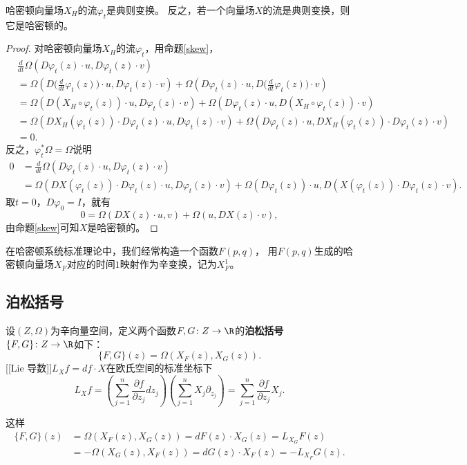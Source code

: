 \begin{proposition}
    哈密顿向量场$X_H$的流$\varphi_t$是典则变换。
    反之，若一个向量场$X$的流是典则变换，则它是哈密顿的。
\end{proposition}
\begin{proof}
    对哈密顿向量场$X_H$的流$\varphi_t$，用命题\ref{skew}，
    \begin{align*}
        &\frac{d}{dt}\Omega(D\varphi_t(z)\cdot u,D\varphi_t(z)\cdot v)\\
        &=\Omega(D\Big(\frac{d}{dt}\varphi_t(z)\Big)\cdot u,D\varphi_t(z)\cdot v)
        +\Omega(D\varphi_t(z)\cdot u,D\Big(\frac{d}{dt}\varphi_t(z)\Big)\cdot v)\\
        &=\Omega(D(X_H\circ\varphi_t(z))\cdot u,D\varphi_t(z)\cdot v)
        +\Omega(D\varphi_t(z)\cdot u,D(X_H\circ\varphi_t(z))\cdot v)\\
        &=\Omega(DX_H(\varphi_t(z))\cdot D\varphi_t(z)\cdot u,D\varphi_t(z)\cdot v)
        +\Omega(D\varphi_t(z)\cdot u,DX_H(\varphi_t(z))\cdot D\varphi_t(z)\cdot v)\\
        &=0.
    \end{align*}
    反之，$\varphi_t^*\Omega=\Omega$说明
    \begin{align*}
        0&=\frac{d}{dt}\Omega(D\varphi_t(z)\cdot u,D\varphi_t(z)\cdot v)\\
        &=\Omega(DX(\varphi_t(z))\cdot D\varphi_t(z)\cdot u,D\varphi_t(z)\cdot v)
        +\Omega(D\varphi_t(z))\cdot u,D(X(\varphi_t(z))\cdot D\varphi_t(z)\cdot v).
    \end{align*}
    取$t=0$，$D\varphi_0=I$，就有
    $$0=\Omega(DX(z)\cdot u,v)+\Omega(u,DX(z)\cdot v),$$
    由命题\ref{skew}可知$X$是哈密顿的。
\end{proof}

\begin{remark}
    在哈密顿系统标准理论中，我们经常构造一个函数$F(p,q)$，
    用$F(p,q)$生成的哈密顿向量场$X_F$对应的时间$1$映射作为辛变换，记为$X_F^1$。
\end{remark}

\subsection{泊松括号}
\begin{definition}
    设$(Z,\Omega)$为辛向量空间，定义两个函数$F,G\colon Z\to\R$的\textbf{泊松括号}
    $\{F,G\}\colon Z\to\R$如下：
    $$\{F,G\}(z)=\Omega(X_F(z),X_G(z)).$$
    [[Lie 导数]]$L_Xf=df\cdot X$在欧氏空间的标准坐标下
    $$L_Xf=\left(\sum_{j=1}^n\frac{\partial f}{\partial z_j}dz_j\right)
    \left(\sum_{j=1}^nX_j\partial_{z_j}\right)
    =\sum_{j=1}^n\frac{\partial f}{\partial z_j}X_j.$$
\end{definition}
这样\begin{align*}
    \{F,G\}(z)&=\Omega(X_F(z),X_G(z))=dF(z)\cdot X_G(z)=L_{X_G}F(z)\\
    &=-\Omega(X_G(z),X_F(z))=dG(z)\cdot X_F(z)=-L_{X_F}G(z).
\end{align*}


